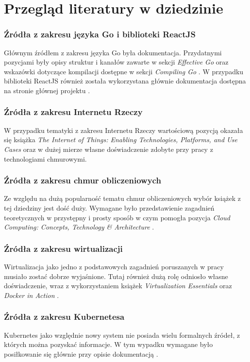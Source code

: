 \documentclass[12pt]{report}
\let\Oldsection\section
\renewcommand{\section}{\FloatBarrier\Oldsection}
\let\Oldsubsubsection\subsubsection
\renewcommand{\subsubsection}{\FloatBarrier\Oldsubsubsection}
\begin{document}
\clearpage

\section{Przegląd literatury w dziedzinie}
\subsubsection{Źródła z zakresu języka Go i biblioteki ReactJS}
	\indent Głównym źródłem z zakresu języka Go była dokumentacja. Przydatnymi pozycjami były opisy struktur i kanałów zawarte w sekcji \textit{Effective Go} \cite{effectiveGo} oraz wskazówki dotyczące kompilacji dostępne w sekcji \textit{Compiling Go} \cite{compileGo}. W przypadku biblioteki ReactJS również została wykorzystana głównie dokumentacja dostępna na stronie głównej projektu \cite{reactJSDoc}.
\subsubsection{Źródła z zakresu Internetu Rzeczy}
	\indent W przypadku tematyki z zakresu Internetu Rzeczy wartościową pozycją okazała się książka \textit{The Internet of Things: Enabling Technologies, Platforms, and Use Cases} \cite{iot} oraz w dużej mierze własne doświadczenie zdobyte przy pracy z technologiami chmurowymi.
\subsubsection{Źródła z zakresu chmur obliczeniowych}
	\indent Ze względu na dużą popularność tematu chmur obliczeniowych wybór książek z tej dziedziny jest dość duży. Wymagane było przedstawienie zagadnień teoretycznych w przystępny i prosty sposób w czym pomogła pozycja \textit{Cloud Computing: Concepts, Technology \& Architecture} \cite{cloud}.
\subsubsection{Źródła z zakresu wirtualizacji}
	\indent Wirtualizacja jako jedno z podstawowych zagadnień poruszanych w pracy musiało zostać dobrze wyjaśnione. Tutaj również dużą rolę odniosło własne doświadczenie, wraz z wykorzystaniem książek \textit{Virtualization Essentials} \cite{virtualization} oraz \textit{Docker in Action} \cite{docker}.
\subsubsection{Źródła z zakresu Kubernetesa}
	\indent Kubernetes jako względnie nowy system nie posiada wielu formalnych źródeł, z których można pozyskać informacje. W tym wypadku wymagane było posiłkowanie się głównie przy opisie dokumentacją \cite{kubernetes}.
\end{document}
